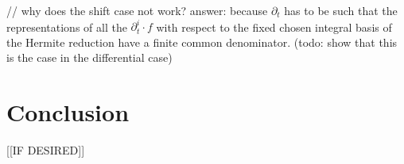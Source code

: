\documentclass{sig-alternate}
\begin{document}
// why does the shift case not work? answer: because $\partial_t$ has to be such that the representations of all the $\partial_t^i\cdot f$
with respect to the fixed chosen integral basis of the Hermite reduction have a finite common denominator.
(todo: show that this is the case in the differential case)


\section{Conclusion}

[[IF DESIRED]]



\end{document}
